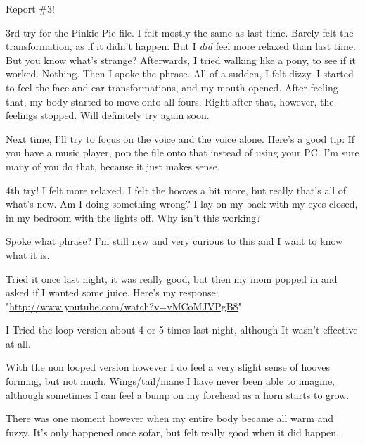 \documentclass[ebook,12pt,oneside,openany]{memoir}
\begin{document}
\begin{tcolorbox}[title=suclearnub]
\begin{tcolorbox}[title=nerfman100]
\par{Report \#3!}
\newline{}
\par{3rd try for the Pinkie Pie file. I felt mostly the same as last time. Barely felt the transformation, as if it didn't happen. But I \textit{did} feel more relaxed than last time. But you know what's strange? Afterwards, I tried walking like a pony, to see if it worked. Nothing. Then I spoke the phrase. All of a sudden, I felt dizzy. I started to feel the face and ear transformations, and my mouth opened. After feeling that, my body started to move onto all fours. Right after that, however, the feelings stopped. Will definitely try again soon.}
\newline{}
\par{Next time, I'll try to focus on the voice and the voice alone. Here's a good tip: If you have a music player, pop the file onto that instead of using your PC. I'm sure many of you do that, because it just makes sense.}
\newline{}
\par{4th try! I felt more relaxed. I felt the hooves a bit more, but really that's all of what's new. Am I doing something wrong? I lay on my back with my eyes closed, in my bedroom with the lights off. Why isn't this working?}
\end{tcolorbox}
\par{Spoke what phrase? I'm still new and very curious to this and I want to know what it is.}
\par{Tried it once last night, it was really good, but then my mom popped in and asked if I wanted some juice. Here's my response: "\href{http://www.youtube.com/watch?v=vMCoMJVPgB8}{http://www.youtube.com/watch?v=vMCoMJVPgB8}"}
\end{tcolorbox}
\begin{tcolorbox}[title=Sam]
\par{I Tried the loop version about 4 or 5 times last night, although It wasn't effective at all.}
\newline{}
\par{With the non looped version however I do feel a very slight sense of hooves forming, but not much. Wings/tail/mane I have never been able to imagine, although sometimes I can feel a bump on my forehead as a horn starts to grow.}
\newline{}
\par{There was one moment however when my entire body became all warm and fuzzy. It's only happened once sofar, but felt really good when it did happen.}
\end{tcolorbox}
\end{document}
